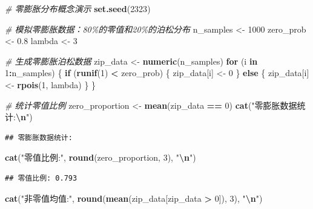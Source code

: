 \documentclass[
  twoside]{book}
\newenvironment{Shaded}{\begin{snugshade}}{\end{snugshade}}
\newcommand{\CommentTok}[1]{\textcolor[rgb]{0.56,0.35,0.01}{\textit{#1}}}
\newcommand{\ControlFlowTok}[1]{\textcolor[rgb]{0.13,0.29,0.53}{\textbf{#1}}}
\newcommand{\DecValTok}[1]{\textcolor[rgb]{0.00,0.00,0.81}{#1}}
\newcommand{\FloatTok}[1]{\textcolor[rgb]{0.00,0.00,0.81}{#1}}
\newcommand{\FunctionTok}[1]{\textcolor[rgb]{0.13,0.29,0.53}{\textbf{#1}}}
\newcommand{\NormalTok}[1]{#1}
\newcommand{\OtherTok}[1]{\textcolor[rgb]{0.56,0.35,0.01}{#1}}
\newcommand{\SpecialCharTok}[1]{\textcolor[rgb]{0.81,0.36,0.00}{\textbf{#1}}}
\newcommand{\StringTok}[1]{\textcolor[rgb]{0.31,0.60,0.02}{#1}}
\begin{document}
\begin{Shaded}
\begin{Highlighting}[]
\CommentTok{\# 零膨胀分布概念演示}
\FunctionTok{set.seed}\NormalTok{(}\DecValTok{2323}\NormalTok{)}

\CommentTok{\# 模拟零膨胀数据：80\%的零值和20\%的泊松分布}
\NormalTok{n\_samples }\OtherTok{\textless{}{-}} \DecValTok{1000}
\NormalTok{zero\_prob }\OtherTok{\textless{}{-}} \FloatTok{0.8}
\NormalTok{lambda }\OtherTok{\textless{}{-}} \DecValTok{3}

\CommentTok{\# 生成零膨胀泊松数据}
\NormalTok{zip\_data }\OtherTok{\textless{}{-}} \FunctionTok{numeric}\NormalTok{(n\_samples)}
\ControlFlowTok{for}\NormalTok{ (i }\ControlFlowTok{in} \DecValTok{1}\SpecialCharTok{:}\NormalTok{n\_samples) \{}
  \ControlFlowTok{if}\NormalTok{ (}\FunctionTok{runif}\NormalTok{(}\DecValTok{1}\NormalTok{) }\SpecialCharTok{\textless{}}\NormalTok{ zero\_prob) \{}
\NormalTok{    zip\_data[i] }\OtherTok{\textless{}{-}} \DecValTok{0}
\NormalTok{  \} }\ControlFlowTok{else}\NormalTok{ \{}
\NormalTok{    zip\_data[i] }\OtherTok{\textless{}{-}} \FunctionTok{rpois}\NormalTok{(}\DecValTok{1}\NormalTok{, lambda)}
\NormalTok{  \}}
\NormalTok{\}}

\CommentTok{\# 统计零值比例}
\NormalTok{zero\_proportion }\OtherTok{\textless{}{-}} \FunctionTok{mean}\NormalTok{(zip\_data }\SpecialCharTok{==} \DecValTok{0}\NormalTok{)}
\FunctionTok{cat}\NormalTok{(}\StringTok{"零膨胀数据统计:}\SpecialCharTok{\textbackslash{}n}\StringTok{"}\NormalTok{)}
\end{Highlighting}
\end{Shaded}

\begin{verbatim}
## 零膨胀数据统计:
\end{verbatim}

\begin{Shaded}
\begin{Highlighting}[]
\FunctionTok{cat}\NormalTok{(}\StringTok{"零值比例:"}\NormalTok{, }\FunctionTok{round}\NormalTok{(zero\_proportion, }\DecValTok{3}\NormalTok{), }\StringTok{"}\SpecialCharTok{\textbackslash{}n}\StringTok{"}\NormalTok{)}
\end{Highlighting}
\end{Shaded}

\begin{verbatim}
## 零值比例: 0.793
\end{verbatim}

\begin{Shaded}
\begin{Highlighting}[]
\FunctionTok{cat}\NormalTok{(}\StringTok{"非零值均值:"}\NormalTok{, }\FunctionTok{round}\NormalTok{(}\FunctionTok{mean}\NormalTok{(zip\_data[zip\_data }\SpecialCharTok{\textgreater{}} \DecValTok{0}\NormalTok{]), }\DecValTok{3}\NormalTok{), }\StringTok{"}\SpecialCharTok{\textbackslash{}n}\StringTok{"}\NormalTok{)}
\end{Highlighting}
\end{Shaded}
\end{document}
